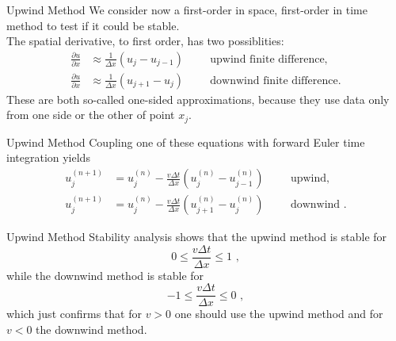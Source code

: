 \documentclass[11pt]{beamer}
\begin{document}
\begin{frame}[fragile]{Upwind Method}
We consider now  a first-order in space, first-order in
time method to test if it could be stable. \\
The spatial
derivative, to first order, has two possiblities:
\begin{equation}
\begin{aligned}
\frac{\partial u}{\partial x} &\approx \frac{1}{\Delta x}(u_j - u_{j-1}) \hspace{1cm}\text{upwind finite difference,}\\
\frac{\partial u}{\partial x} &\approx \frac{1}{\Delta x}(u_{j+1} - u_{j})
\hspace{1cm}\text{downwind finite difference.}
\end{aligned}
\end{equation}
These are both so-called one-sided approximations, because they use
data only from one side or the other of point $x_j$. 
\end{frame}

\begin{frame}[fragile]{Upwind Method}
Coupling one
of these equations with forward Euler time integration yields
\begin{equation}
\begin{aligned}
u_j^{(n+1)} &= u_j^{(n)} - \frac{v\Delta t}{\Delta x} \left(u_j^{(n)} - u_{j-1}^{(n)}\right) \hspace{1cm}\text{upwind,}\\
u_j^{(n+1)} &= u_j^{(n)} - \frac{v\Delta t}{\Delta x} \left(u_{j+1}^{(n)} - u_{j}^{(n)}\right) \hspace{1cm}\text{downwind}\,\,.
\end{aligned}
\end{equation}
\end{frame}

\begin{frame}[fragile]{Upwind Method}
Stability analysis shows that the upwind method is stable for
\begin{equation}
0 \le \frac{v \Delta t}{\Delta x} \le 1\,\,,
\end{equation}
while the downwind method is stable for
\begin{equation}
-1 \le \frac{v \Delta t}{\Delta x} \le 0\,\,,
\end{equation}
which just confirms that for $v > 0$ one should use the upwind
method and for $v < 0$ the downwind method.
\end{frame}
\end{document}

